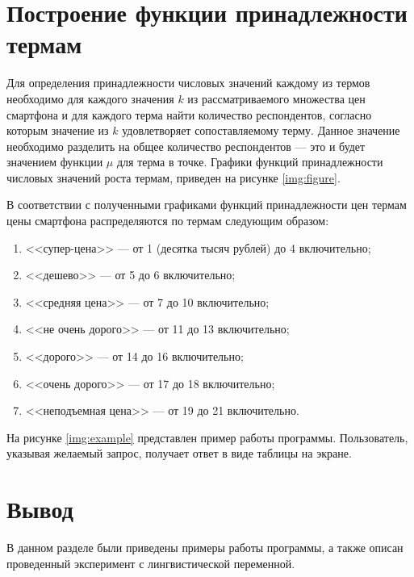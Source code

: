 \section{Построение функции принадлежности термам}

Для определения принадлежности числовых значений каждому из термов необходимо для каждого значения $k$ из рассматриваемого множества цен смартфона и для каждого терма найти количество респондентов, согласно которым значение из $k$ удовлетворяет сопоставляемому терму.
Данное значение необходимо разделить на общее количество респондентов --- это и будет значением функции $\mu$ для терма в точке.
Графики функций принадлежности числовых значений роста термам, приведен на рисунке \ref{img:figure}.


В соответствии с полученными графиками функций принадлежности цен термам цены смартфона распределяются по термам следующим образом:
\begin{enumerate}
	\item <<супер-цена>> --- от 1 (десятка тысяч рублей) до 4 включительно;
	\item <<дешево>> --- от 5 до 6 включительно;
	\item <<средняя цена>> --- от 7 до 10 включительно;
	\item <<не очень дорого>> --- от 11 до 13 включительно;
	\item <<дорого>> --- от 14 до 16 включительно;
	\item <<очень дорого>> --- от 17 до 18 включительно;
	\item <<неподъемная цена>> --- от 19 до 21 включительно.
\end{enumerate}


На рисунке \ref{img:example} представлен пример работы программы. Пользователь, указывая желаемый запрос, получает ответ в виде таблицы на экране.


\section*{Вывод}

В данном разделе были приведены примеры работы программы, а также описан проведенный эксперимент с лингвистической переменной.


